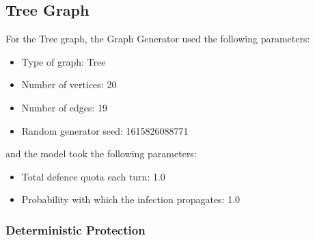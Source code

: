 \documentclass[results.tex]{subfiles}
\begin{document}
\newpage

\subsection{Tree Graph}

For the Tree graph, the Graph Generator used the following parameters:

\begin{itemize}
\item Type of graph: Tree
\item Number of vertices: 20
\item Number of edges: 19
\item Random generator seed: 1615826088771
\end{itemize}
and the model took the following parameters:
\begin{itemize}
\item Total defence quota each turn: 1.0
\item Probability with which the infection propagates: 1.0
\end{itemize}

\subsubsection{Deterministic Protection}



\newpage
\end{document}
